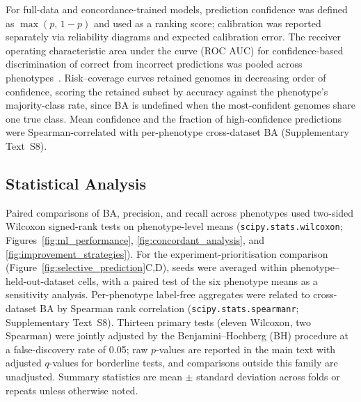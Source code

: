For full-data and concordance-trained models, prediction confidence was defined as $\max(p,\,1-p)$ and used as a ranking score; calibration was reported separately via reliability diagrams and expected calibration error.
The receiver operating characteristic area under the curve (ROC AUC) for confidence-based discrimination of correct from incorrect predictions was pooled across phenotypes~\cite{Pedregosa2011Sklearn}.
Risk--coverage curves retained genomes in decreasing order of confidence, scoring the retained subset by accuracy against the phenotype's majority-class rate, since BA is undefined when the most-confident genomes share one true class.
Mean confidence and the fraction of high-confidence predictions were Spearman-correlated with per-phenotype cross-dataset BA (Supplementary Text~S8).

\subsection*{Statistical Analysis}

Paired comparisons of BA, precision, and recall across phenotypes used two-sided Wilcoxon signed-rank tests on phenotype-level means (\texttt{scipy.stats.\allowbreak wilcoxon}; Figures~\ref{fig:ml_performance}, \ref{fig:concordant_analysis}, and \ref{fig:improvement_strategies}).
For the experiment-prioritisation comparison (Figure~\ref{fig:selective_prediction}C,D), seeds were averaged within phenotype--held-out-dataset cells, with a paired test of the six phenotype means as a sensitivity analysis.
Per-phenotype label-free aggregates were related to cross-dataset BA by Spearman rank correlation (\texttt{scipy.stats.\allowbreak spearmanr}; Supplementary Text~S8).
Thirteen primary tests (eleven Wilcoxon, two Spearman) were jointly adjusted by the Benjamini--Hochberg (BH) procedure at a false-discovery rate of 0.05; raw $p$-values are reported in the main text with adjusted $q$-values for borderline tests, and comparisons outside this family are unadjusted.
Summary statistics are mean $\pm$ standard deviation across folds or repeats unless otherwise noted.
